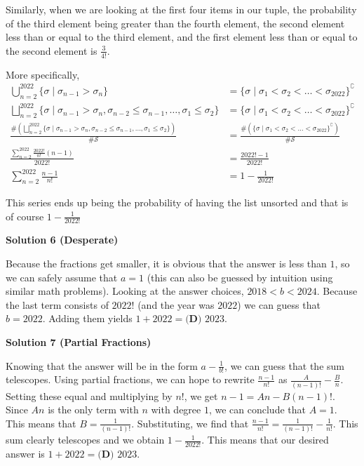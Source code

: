 \begin{enumerate}
 Similarly, when we are looking at the first four items in our tuple, the probability of the third element being greater than the fourth element, the second element less than or equal to the third element, and the first element less than or equal to the second element is $\frac{3}{4!}$.

 More specifically, 
 \begin{align*} \bigcup_{n=2}^{2022}\{\sigma \mid \sigma_{n-1}>\sigma_n\}&=\{\sigma \mid \sigma_{1}<\sigma_{2}<\ldots<\sigma_{2022}\}^\complement\\ \bigsqcup_{n=2}^{2022}\{\sigma \mid \sigma_{n-1}>\sigma_n, \sigma_{n-2}\leq\sigma_{n-1},\ldots, \sigma_{1}\leq\sigma_{2}\}&=\{\sigma \mid \sigma_{1}<\sigma_{2}<\ldots<\sigma_{2022}\}^\complement\\ \frac{\#\left(\bigsqcup_{n=2}^{2022}\{\sigma \mid \sigma_{n-1}>\sigma_n, \sigma_{n-2}\leq\sigma_{n-1},\ldots, \sigma_{1}\leq\sigma_{2}\}\right)}{\#\mathcal{S}}&=\frac{\#\left(\{\sigma \mid \sigma_{1}<\sigma_{2}<\ldots<\sigma_{2022}\}^\complement\right)}{\#\mathcal{S}}\\ \frac{\sum_{n=2}^{2022}\frac{2022!}{n!}(n-1)}{2022!}&=\frac{2022!-1}{2022!}\\ \sum_{n=2}^{2022}\frac{n-1}{n!}&=1-\frac{1}{2022!} \end{align*}


 This series ends up being the probability of having the list unsorted and that is of course $1-\frac{1}{2022!}$




\textbf{Solution 6 (Desperate)}

Because the fractions get smaller, it is obvious that the answer is less than $1$, so we can safely assume that $a=1$ (this can also be guessed by intuition using similar math problems). Looking at the answer choices, $2018<b<2024$. Because the last term consists of $2022!$ (and the year was $2022$) we can guess that $b=2022$. Adding them yields $1+2022=\boxed{\textbf{(D) }2023}$.

 



\textbf{Solution 7 (Partial Fractions)}

Knowing that the answer will be in the form $a-\frac{1}{b!}$, we can guess that the sum telescopes. Using partial fractions, we can hope to rewrite $\frac{n-1}{n!}$ as $\frac{A}{(n-1)!}-\frac{B}{n}$. Setting these equal and multiplying by $n!$, we get $n-1=An-B(n-1)!$. Since $An$ is the only term with $n$ with degree $1$, we can conclude that $A=1$. This means that $B=\frac{1}{(n-1)!}$. Substituting, we find that $\frac{n-1}{n!}=\frac{1}{(n-1)!}-\frac{1}{n!}$. This sum clearly telescopes and we obtain $1-\frac{1}{2022!}$. This means that our desired answer is $1+2022=\boxed{\textbf{(D) }2023}.$





\end{enumerate}
